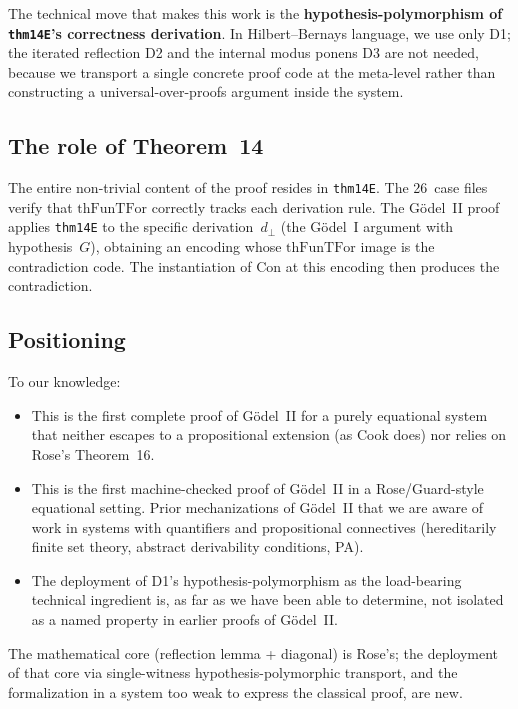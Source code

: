\documentclass[11pt]{article}
\newcommand{\thFunTFor}{\mathrm{thFunTFor}}
\begin{document}
The technical move that makes this work is the
\textbf{hypothesis-polymorphism of \texttt{thm14E}'s
correctness derivation}.  In Hilbert--Bernays language,
we use only D1; the iterated reflection D2 and the internal
modus ponens D3 are not needed, because we transport a
single concrete proof code at the meta-level rather than
constructing a universal-over-proofs argument inside the
system.

\subsection*{The role of Theorem~14}

The entire non-trivial content of the proof resides in
\texttt{thm14E}.  The 26~case files verify that $\thFunTFor$
correctly tracks each derivation rule.  The G\"odel~II proof
applies \texttt{thm14E} to the specific derivation~$d_\bot$
(the G\"odel~I argument with hypothesis~$G$), obtaining an
encoding whose $\thFunTFor$ image is the contradiction code.
The instantiation of $\mathrm{Con}$ at this encoding then
produces the contradiction.

\subsection*{Positioning}

To our knowledge:
\begin{itemize}
\item This is the first complete proof of G\"odel~II for a
  purely equational system that neither escapes to a
  propositional extension (as Cook does) nor relies on
  Rose's Theorem~16.
\item This is the first machine-checked proof of G\"odel~II
  in a Rose/Guard-style equational setting.  Prior
  mechanizations of G\"odel~II that we are aware of work in
  systems with quantifiers and propositional connectives
  (hereditarily finite set theory, abstract derivability
  conditions, PA).
\item The deployment of D1's hypothesis-polymorphism as the
  load-bearing technical ingredient is, as far as we have
  been able to determine, not isolated as a named property
  in earlier proofs of G\"odel~II.
\end{itemize}
The mathematical core (reflection lemma + diagonal) is
Rose's; the deployment of that core via single-witness
hypothesis-polymorphic transport, and the formalization in
a system too weak to express the classical proof, are new.
\end{document}

